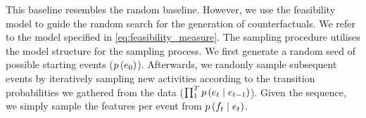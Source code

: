 \documentclass[./../../paper.tex]{subfiles}
\begin{document}
This baseline resembles the random baseline. However, we use the feasibility model to guide the random search for the generation of counterfactuals. We refer to the model specified in \autoref{eq:feasibility_measure}. The sampling procedure utilises the model structure for the sampling process. We first generate a random seed of possible starting events ($p\left(e_0\right)$). Afterwards, we randonly sample subsequent events by iteratively sampling new activities according to the transition probabilities we gathered from the data ($\prod_1^T p\left(e_t \mid e_{t-1}\right)$). Given the sequence, we simply sample the features per event from $p\left(f_t \mid e_t\right)$. 

\end{document}
